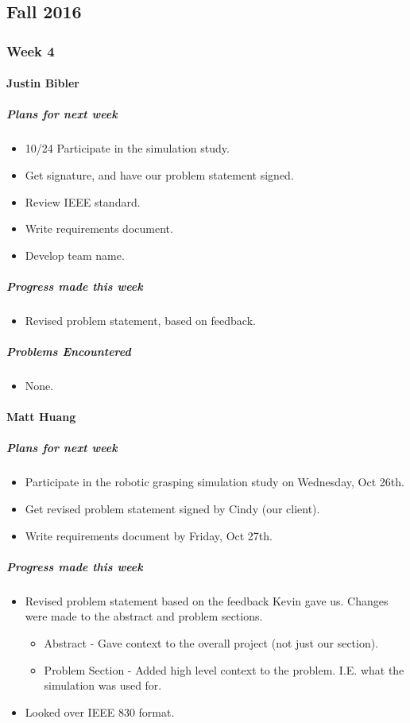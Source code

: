 \subsection{Fall 2016}

{
\subsubsection{Week 4}
\paragraph{Justin Bibler}
\subparagraph{Plans for next week}
\begin{itemize}
  \item 10/24 Participate in the simulation study.
  \item Get signature, and have our problem statement signed.
  \item Review IEEE standard.
  \item Write requirements document.
  \item Develop team name.
\end{itemize}

\subparagraph{Progress made this week}
\begin{itemize}
  \item Revised problem statement, based on feedback.
\end{itemize}

\subparagraph{Problems Encountered}
\begin{itemize}
  \item None.
\end{itemize}
\vspace{3mm}

\paragraph{Matt Huang}
\subparagraph{Plans for next week}
\begin{itemize}
  \item Participate in the robotic grasping simulation study on Wednesday, Oct 26th.
  \item Get revised problem statement signed by Cindy (our client).
  \item Write requirements document by Friday, Oct 27th.
\end{itemize}

\subparagraph{Progress made this week}
\begin{itemize}
  \item Revised problem statement based on the feedback Kevin gave us. Changes were made to the abstract and problem sections.
    \begin{itemize}
      \item Abstract - Gave context to the overall project (not just our section).
      \item Problem Section - Added high level context to the problem. I.E. what the simulation was used for.
    \end{itemize}
  \item Looked over IEEE 830 format.
\end{itemize}

}
